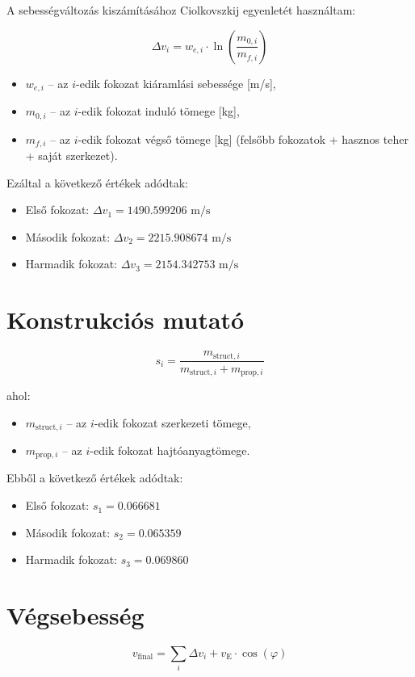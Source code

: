\documentclass[a4paper,12pt]{article}
\begin{document}
A sebességváltozás kiszámításához Ciolkovszkij egyenletét használtam:

\[
\Delta v_i = w_{e,i} \cdot \ln\left( \frac{m_{0,i}}{m_{f,i}} \right)
\]

\begin{itemize}
    \item \( w_{e,i} \) – az \(i\)-edik fokozat kiáramlási sebessége [m/s],
    \item \( m_{0,i} \) – az \(i\)-edik fokozat induló tömege [kg],
    \item \( m_{f,i} \) – az \(i\)-edik fokozat végső tömege [kg] (felsőbb fokozatok + hasznos teher + saját szerkezet).
  \end{itemize}

Ezáltal a következő értékek adódtak:
\begin{itemize}
    \item Első fokozat: \(\Delta v_1 = 1490.599206 \text{ m/s}\)
    \item Második fokozat: \(\Delta v_2 = 2215.908674 \text{ m/s}\)
    \item Harmadik fokozat: \(\Delta v_3 = 2154.342753 \text{ m/s}\)
\end{itemize}

\section{Konstrukciós mutató}

\[
s_i = \frac{m_{\text{struct},i}}{m_{\text{struct},i} + m_{\text{prop},i}}
\]

ahol:
\begin{itemize}
  \item \( m_{\text{struct},i} \) – az \(i\)-edik fokozat szerkezeti tömege,
  \item \( m_{\text{prop},i} \) – az \(i\)-edik fokozat hajtóanyagtömege.
\end{itemize}

Ebből a következő értékek adódtak:
\begin{itemize}
    \item Első fokozat: \(s_1 = 0.066681\)
    \item Második fokozat: \(s_2 = 0.065359\)
    \item Harmadik fokozat: \(s_3 = 0.069860\)
\end{itemize}

\section{Végsebesség}
\[
v_{\text{final}} = \sum_i \Delta v_i + v_{\text{E}} \cdot \cos(\varphi)
\]
\end{document}
